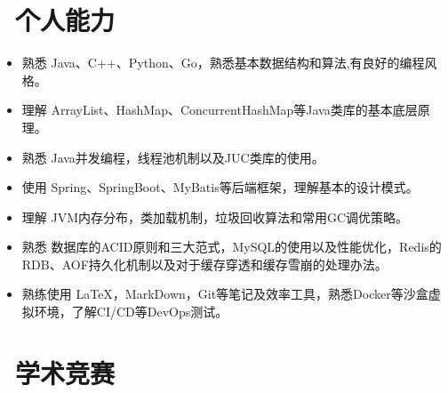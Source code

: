 \documentclass{resume}
\begin{document}
\vspace{-1.5ex}

\section{\faCogs\ 个人能力}
\begin{itemize}[parsep=0.5ex]
  \item 熟悉 Java、C++、Python、Go，熟悉基本数据结构和算法,有良好的编程风格。
  \item 理解 ArrayList、HashMap、ConcurrentHashMap等Java类库的基本底层原理。
  \item 熟悉 Java并发编程，线程池机制以及JUC类库的使用。
  \item 使用 Spring、SpringBoot、MyBatis等后端框架，理解基本的设计模式。
  \item 理解 JVM内存分布，类加载机制，垃圾回收算法和常用GC调优策略。
  \item 熟悉 数据库的ACID原则和三大范式，MySQL的使用以及性能优化，Redis的RDB、AOF持久化机制以及对于缓存穿透和缓存雪崩的处理办法。
  \item 熟练使用 \LaTeX，MarkDown，Git等笔记及效率工具，熟悉Docker等沙盒虚拟环境，了解CI/CD等DevOps测试。
\end{itemize}

\vspace{-1ex}
\vspace{-1ex}

\section{\faTrophy\ 学术竞赛}



%
%
\end{document}
